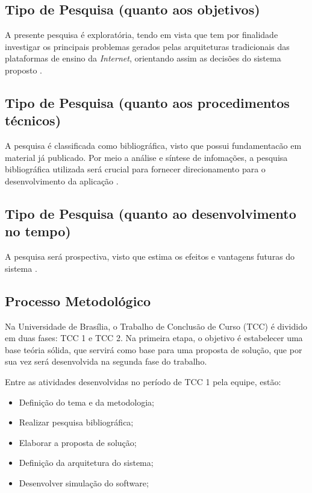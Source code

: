 \subsection{Tipo de Pesquisa (quanto aos objetivos)}
A presente pesquisa é exploratória, tendo em vista que tem por finalidade investigar os principais problemas gerados pelas arquiteturas tradicionais das plataformas de ensino da \textit{Internet}, orientando assim as decisões do sistema proposto \cite{fontelles2009}.

\subsection{Tipo de Pesquisa (quanto aos procedimentos técnicos)}
A pesquisa é classificada como bibliográfica, visto que possui fundamentacão em material já publicado. Por meio a análise e síntese de infomações, a pesquisa bibliográfica utilizada será crucial para fornecer direcionamento para o desenvolvimento da aplicação \cite{fontelles2009}.

\subsection{Tipo de Pesquisa (quanto ao desenvolvimento no tempo)}
A pesquisa será prospectiva, visto que estima os efeitos e vantagens futuras do sistema \cite{fontelles2009}.

\subsection{Processo Metodológico}
Na Universidade de Brasília, o Trabalho de Conclusão de Curso (TCC) é dividido em duas fases: TCC 1 e TCC 2. Na primeira etapa, o objetivo é estabelecer uma base teória sólida, que servirá como base para uma proposta de solução, que por sua vez será desenvolvida na segunda fase do trabalho.

Entre as atividades desenvolvidas no período de TCC 1 pela equipe, estão:
\begin{itemize}
    \item Definição do tema e da metodologia;
    \item Realizar pesquisa bibliográfica;
    \item Elaborar a proposta de solução;
    \item Definição da arquitetura do sistema;
    \item Desenvolver simulação do software;
\end{itemize}


